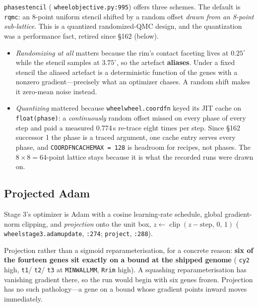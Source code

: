 \documentclass[11pt,a4paper]{article}
\DeclareRobustCommand{\code}[1]{%
  \texttt{\small\def\_{\textunderscore\discretionary{}{}{}}#1}}
\newcommand{\at}[2]{\code{#1:#2}}
\begin{document}
\code{phase\_stencil} (\at{wheel\_objective.py}{995}) offers three schemes. The default
is \code{rqmc}: an 8-point uniform stencil shifted by a random offset \emph{drawn from
an 8-point sub-lattice}. This is a quantized randomized-QMC design, and the
quantization was a performance fact, retired since \S162 (below).

\begin{itemize}
\item \emph{Randomizing at all} matters because the rim's contact faceting lives at
  $0.25^\circ$ while the stencil samples at $3.75^\circ$, so the artefact
  \textbf{aliases}. Under a fixed stencil the aliased artefact is a deterministic
  function of the genes with a nonzero gradient---precisely what an optimizer chases. A
  random shift makes it zero-mean noise instead.
\item \emph{Quantizing} mattered because \code{wheel\_wheel.coord\_fn} keyed its JIT
  cache on \code{float(phase)}: a \emph{continuously} random offset missed on every
  phase of every step and paid a measured 0.774\,s re-trace eight times per step. Since
  \S162 successor 1 the phase is a traced argument, one cache entry serves every phase,
  and \code{\_COORD\_FN\_CACHE\_MAX = 128} is headroom for recipes, not phases. The
  $8\times8 = 64$-point lattice stays because it is what the recorded runs were drawn on.
\end{itemize}

\subsection{Projected Adam}
\label{sec:adam}

Stage 3's optimizer is Adam with a cosine learning-rate schedule, global gradient-norm
clipping, and \emph{projection} onto the unit box,
$z \leftarrow \operatorname{clip}(z - \mathrm{step},\,0,\,1)$
(\code{wheel\_stage3.adam\_update}, \code{:274}; \code{project}, \code{:288}).

Projection rather than a sigmoid reparameterisation, for a concrete reason:
\textbf{six of the fourteen genes sit exactly on a bound at the shipped genome}
(\code{cy2} high, \code{t1}/\code{t2}/\code{t3} at \code{MIN\_WALL\_MM}, \code{R\_rim}
high). A squashing reparameterisation has vanishing gradient there, so the run would
begin with six genes frozen. Projection has no such pathology---a gene on a bound whose
gradient points inward moves immediately.

\end{document}

